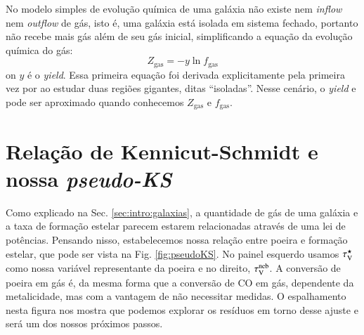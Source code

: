 No modelo simples de evolução química de uma galáxia não existe nem {\em inflow} nem {\em outflow}
de gás, isto é, uma galáxia está isolada em sistema fechado, portanto não recebe mais gás além de
seu gás inicial, simplificando a equação da evolução química do gás:
\begin{equation}
	Z_{\mathrm{gas}} = - y \ln f_{\mathrm{gas}}
	\label{eq:Zgas_closedbox}
\end{equation}
\noindent on $y$ é o {\em yield}. Essa primeira equação foi derivada explicitamente pela primeira
vez por \citet{Searle.Sargent.1972a} ao estudar duas regiões \Hii gigantes, ditas ``isoladas''.
Nesse cenário, o {\em yield} e pode ser aproximado quando conhecemos $Z_{\mathrm{gas}}$ e
$f_{\mathrm{gas}}$.

\section{Relação de Kennicut-Schmidt e nossa {\em pseudo-KS}}
\label{sec:gasfrac:KS}

Como explicado na Sec. \ref{sec:intro:galaxias}, a quantidade de gás de uma galáxia e a taxa de
formação estelar parecem estarem relacionadas através de uma lei de potências. Pensando nisso,
estabelecemos nossa relação entre poeira e formação estelar, que pode ser vista na Fig.
\ref{fig:pseudoKS}. No painel esquerdo usamos $\tau_{\mathrm{V}}^\star$ como nossa variável representante da poeira e
no direito, $\tau_{\mathrm{V}}^{\mathrm{neb}}$. A conversão de poeira em gás é, da mesma forma que a conversão de CO em gás,
dependente da metalicidade, mas com a vantagem de não necessitar medidas. O espalhamento
nesta figura nos mostra que podemos explorar os resíduos em torno desse ajuste e será um dos nossos próximos passos. 

